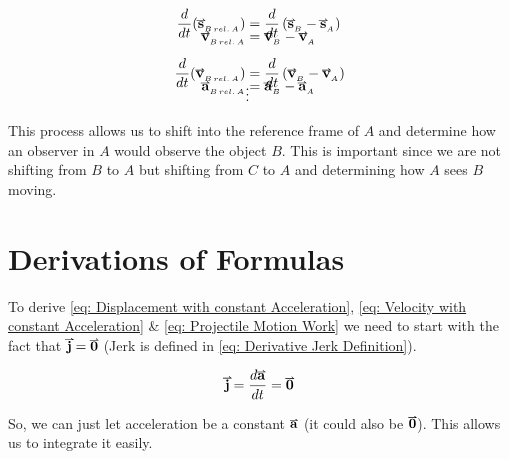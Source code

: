 \documentclass[main.tex]{subfiles}
\begin{document}
                        \begin{align*}
                            \frac{d}{dt}(\vect{s}_{_{B\, rel.\, A}}) &= \frac{d}{dt}\left(\vect{s}_{_B} - \vect{s}_{_A}\right)\\[-1em]
                            \vect{v}_{_{B\, rel.\, A}} &= \vect{v}_{_B} - \vect{v}_{_A}\\[0.5em]
                            \frac{d}{dt}(\vect{v}_{_{B\, rel.\, A}}) &= \frac{d}{dt}\left(\vect{v}_{_B} - \vect{v}_{_A}\right)\\[-1em]
                            \vect{a}_{_{B\, rel.\, A}} &= \vect{a}_{_B} - \vect{a}_{_A}\\[-1.5em]
                            &\vdots
                        \end{align*}

                        This process allows us to shift into the reference frame of $A$ and determine how an observer in $A$ would observe the object $B$. This is important since we are not shifting from $B$ to $A$ but shifting from $C$ to $A$ and determining how $A$ sees $B$ moving.

                
            
            \newpage
            \section{Derivations of Formulas}
                \label{sec: Derivations of Formulas Kinematics}

                To derive \eqref{eq: Displacement with constant Acceleration}, \eqref{eq: Velocity with constant Acceleration} \& \eqref{eq: Projectile Motion Work} we need to start with the fact that $\vect{j} = \vect{0}$ (Jerk is defined in \eqref{eq: Derivative Jerk Definition}).

                \begin{equation*}
                    \vect{j}  = \frac{d\vect{a}}{dt} = \vect{0}
                \end{equation*}

                So, we can just let acceleration be a constant $\vect{a}$ (it could also be $\vect{0}$). This allows us to integrate it easily.
                
\end{document}
